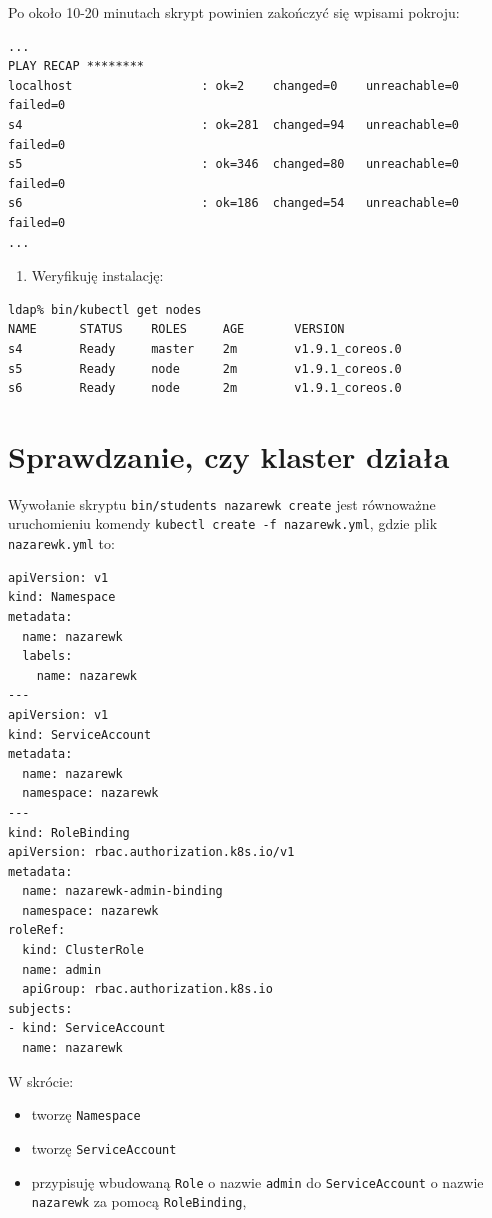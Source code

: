 \documentclass[a4paper,12pt,twoside,openany]{report}
\providecommand{\tightlist}{%
  \setlength{\itemsep}{0pt}\setlength{\parskip}{0pt}}
\newcommand{\passthrough}[1]{#1}
\begin{document}
Po około 10-20 minutach skrypt powinien zakończyć się wpisami pokroju:

\begin{lstlisting}
...
PLAY RECAP ********
localhost                  : ok=2    changed=0    unreachable=0    failed=0   
s4                         : ok=281  changed=94   unreachable=0    failed=0   
s5                         : ok=346  changed=80   unreachable=0    failed=0   
s6                         : ok=186  changed=54   unreachable=0    failed=0   
...
\end{lstlisting}

\begin{enumerate}
\def\labelenumi{\arabic{enumi}.}
\setcounter{enumi}{8}
\tightlist
\item
  Weryfikuję instalację:
\end{enumerate}

\begin{lstlisting}[language=bash]
ldap% bin/kubectl get nodes
NAME      STATUS    ROLES     AGE       VERSION
s4        Ready     master    2m        v1.9.1_coreos.0
s5        Ready     node      2m        v1.9.1_coreos.0
s6        Ready     node      2m        v1.9.1_coreos.0
\end{lstlisting}

\hypertarget{sprawdzanie-czy-klaster-dziaux142a}{%
\section{Sprawdzanie, czy klaster
działa}\label{sprawdzanie-czy-klaster-dziaux142a}}

Wywołanie skryptu \passthrough{\lstinline!bin/students nazarewk create!}
jest równoważne uruchomieniu komendy
\passthrough{\lstinline!kubectl create -f nazarewk.yml!}, gdzie plik
\passthrough{\lstinline!nazarewk.yml!} to:

\begin{lstlisting}
apiVersion: v1
kind: Namespace
metadata:
  name: nazarewk
  labels:
    name: nazarewk
---
apiVersion: v1
kind: ServiceAccount
metadata:
  name: nazarewk
  namespace: nazarewk
---
kind: RoleBinding
apiVersion: rbac.authorization.k8s.io/v1
metadata:
  name: nazarewk-admin-binding
  namespace: nazarewk
roleRef:
  kind: ClusterRole
  name: admin
  apiGroup: rbac.authorization.k8s.io
subjects:
- kind: ServiceAccount
  name: nazarewk
\end{lstlisting}

W skrócie:

\begin{itemize}
\tightlist
\item
  tworzę \passthrough{\lstinline!Namespace!}
\item
  tworzę \passthrough{\lstinline!ServiceAccount!}
\item
  przypisuję wbudowaną \passthrough{\lstinline!Role!} o nazwie
  \passthrough{\lstinline!admin!} do
  \passthrough{\lstinline!ServiceAccount!} o nazwie
  \passthrough{\lstinline!nazarewk!} za pomocą
  \passthrough{\lstinline!RoleBinding!},
\end{itemize}
\end{document}
